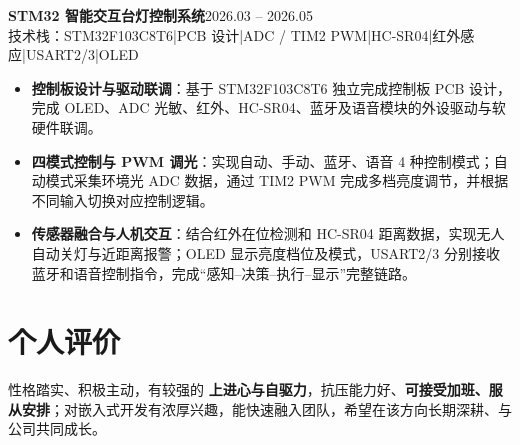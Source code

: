 \documentclass[10pt,a4paper]{article}
\newcommand{\projectblock}[3]{%
    {\bfseries\color{darktext}#1}\hfill{\color{graytext}#2}\\%
    {\small\color{graytext}#3}%
    \vspace{0.15em}%
}
\begin{document}
\vspace{0.15em}

\projectblock{STM32 智能交互台灯控制系统}{2026.03 -- 2026.05}{技术栈：STM32F103C8T6\hspace{0.3em}|\hspace{0.3em}PCB 设计\hspace{0.3em}|\hspace{0.3em}ADC / TIM2 PWM\hspace{0.3em}|\hspace{0.3em}HC-SR04\hspace{0.3em}|\hspace{0.3em}红外感应\hspace{0.3em}|\hspace{0.3em}USART2/3\hspace{0.3em}|\hspace{0.3em}OLED}

\begin{itemize}[leftmargin=1.5em, itemsep=1pt, parsep=0pt, topsep=2pt]
    \item \textbf{控制板设计与驱动联调}：基于 STM32F103C8T6 独立完成控制板 PCB 设计，完成 OLED、ADC 光敏、红外、HC-SR04、蓝牙及语音模块的外设驱动与软硬件联调。
    \item \textbf{四模式控制与 PWM 调光}：实现自动、手动、蓝牙、语音 4 种控制模式；自动模式采集环境光 ADC 数据，通过 TIM2 PWM 完成多档亮度调节，并根据不同输入切换对应控制逻辑。
    \item \textbf{传感器融合与人机交互}：结合红外在位检测和 HC-SR04 距离数据，实现无人自动关灯与近距离报警；OLED 显示亮度档位及模式，USART2/3 分别接收蓝牙和语音控制指令，完成“感知--决策--执行--显示”完整链路。
\end{itemize}

\vspace{0.15em}

\section{\faUser\hspace{0.4em}个人评价}

性格踏实、积极主动，有较强的 \textbf{上进心与自驱力}，抗压能力好、\textbf{可接受加班、服从安排}；对嵌入式开发有浓厚兴趣，能快速融入团队，希望在该方向长期深耕、与公司共同成长。
\end{document}

